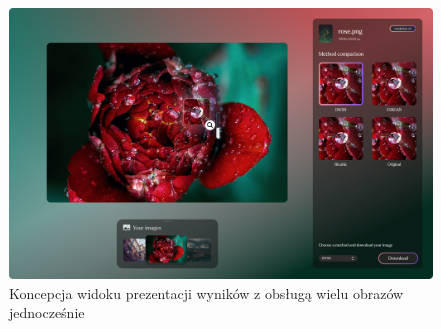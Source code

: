 \begin{figure}[H]
    \centering
    \includegraphics[width=0.9\linewidth]{Rozdziały/06.Aplikacja/Obrazy/concept-display.png}
    \caption{Koncepcja widoku prezentacji wyników z obsługą wielu obrazów jednocześnie}
    \label{fig:image97}
\end{figure}
